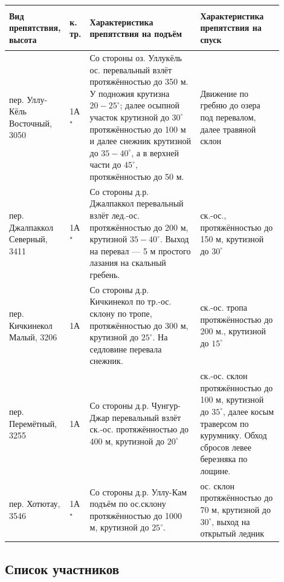 \begin{table}[h!]
		\begin{tabular}{|>{\centering\arraybackslash}m{0.17\linewidth}|>{\centering\arraybackslash}m{0.03\linewidth}|>{\centering\arraybackslash}m{0.4\linewidth}|>{\centering\arraybackslash}m{0.3\linewidth}|}
			\hline
			\textbf{Вид препятствия, высота} &
			\begin{turn}{90}\textbf{к. тр.}\end{turn} &
			\textbf{Характеристика препятствия на подъём} &
			\textbf{Характеристика препятствия на спуск} \\
			\hline			
			пер. Уллу-Кёль Восточный, 3050 & 1А$^{\star}$ &  Со стороны оз. Уллукёль ос. перевальный взлёт протяжённостью до 350 м. У подножия крутизна $20-25^{\circ}$; далее осыпной участок крутизной до $30^{\circ}$ протяжённостью до 100 м и далее снежник крутизной до $35-40^{\circ}$, а в верхней части до $45^{\circ}$, протяжённостью до 50 м. & Движение по гребню до озера под перевалом, далее травяной склон \\
			\hline			
			пер. Джалпаккол Северный, 3411  & 1А$^{\star}$ & Со стороны д.р. Джалпаккол перевальный взлёт лед.-ос. протяжённостью до 200 м, крутизной $35-40^{\circ}$. Выход на перевал — 5 м простого лазания на скальный гребень.  & ск.-ос., протяжённостью до 150 м, крутизной до $30^{\circ}$ \\
			\hline
			пер. Кичкинекол Малый, 3206  & 1А & Со стороны д.р. Кичкинекол по тр.-ос. склону по тропе, протяжённостью до 300 м, крутизной до $25^{\circ}$. На седловине перевала снежник. & ск.-ос. тропа протяжённостью до 200 м., крутизной до $15^{\circ}$\\
			\hline
			пер. Перемётный, 3255  & 1А & Со стороны д.р. Чунгур-Джар перевальный взлёт ск.-ос. протяжённостью до 400 м, крутизной до  $20^{\circ}$ & ск.-ос. склон протяжённостью до 100 м, крутизной до $35^{\circ}$, далее косым траверсом по курумнику. Обход сбросов левее березняка по лощине.\\
			\hline
			пер. Хотютау, 3546  & 1А$^{\star}$ & Со стороны д.р. Уллу-Кам подъём по ос.склону протяжённостью до 1000 м, крутизной до $25^{\circ}$. &  ос. склон протяжённостью до 70 м, крутизной до $30^{\circ}$, выход на открытый ледник\\
			\hline
	\end{tabular}%
\end{table}

\newpage
\subsection{Список участников} 

